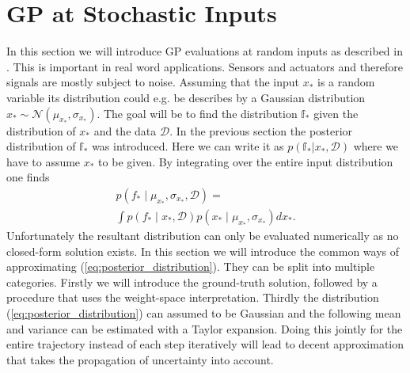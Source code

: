 \section{GP at Stochastic Inputs}
    In this section we will introduce GP evaluations at random inputs as described in \cite{Paper2:UncertainInputPredictions,Paper3:GPPriorsWithUncertainInputs}. This is important in real word applications. Sensors and actuators and therefore signals are mostly subject to noise. Assuming that the input $x_*$ is a random variable its distribution could e.g. be describes by a Gaussian distribution $x_* \sim \mathcal N(\mu_x_*, \sigma_x_*)$. The goal will be to find the distribution $\mathbb f_*$ given the distribution of $x_*$ and the data $\mathcal D$.  In the previous section the posterior distribution of $\mathbb f_*$ was introduced. Here we can write it as $p(\mathbb f_*|x_*,\mathcal D)$ where we have to assume $x_*$ to be given. By integrating over the entire input distribution one finds
    \begin{equation}
        \label{eq:posterior_distribution}
        \begin{split}
        p\left(f_{*} \mid \mu_x_*, \sigma_x_*, \mathcal{D}\right)=\\
        \int p\left(f_{*} \mid x_{*}, \mathcal{D}\right) p\left({x}_{*} \mid \mu_x_*, \sigma_x_*\right) d {x}_{*}.
        \end{split}
    \end{equation}
    Unfortunately the resultant distribution can only be evaluated numerically as no closed-form solution exists. In this section we will introduce the common ways of approximating (\ref{eq:posterior_distribution}). They can be split into multiple categories. Firstly we will introduce the ground-truth solution, followed by a procedure that uses the weight-space interpretation. Thirdly the distribution (\ref{eq:posterior_distribution}) can assumed to be Gaussian and the following mean and variance can be estimated with a Taylor expansion. Doing this jointly for the entire trajectory instead of each step iteratively will lead to decent approximation that takes the propagation of uncertainty into account.
